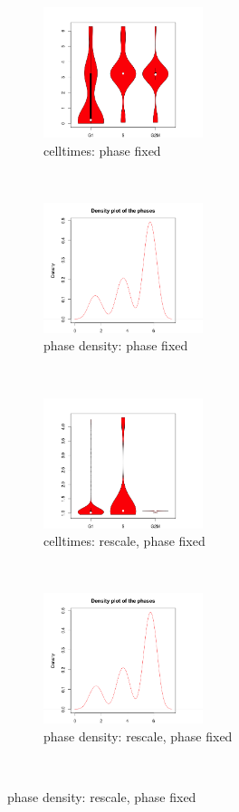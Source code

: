 \documentclass[11pt]{article}
\begin{document}
\begin{figure}[ht]
       \begin{subfigure}[t]{0.5\textwidth}
        \centering
        \includegraphics[height=1.5in]{../figures/cell_order_R_figs/marioni_phase_fixed_celltimes.png}
        \caption{celltimes: phase fixed}
    \end{subfigure}%
    ~
    \begin{subfigure}[t]{0.5\textwidth}
        \centering
        \includegraphics[height=1.5in]{../figures/cell_order_R_figs/marioni_phase_density_phase_in.png}
        \caption{phase density: phase fixed}
    \end{subfigure}\\
    
     \begin{subfigure}[t]{0.5\textwidth}
        \centering
        \includegraphics[height=1.5in]{../figures/cell_order_R_figs/marioni_phase_fixed_norm_celltimes.png}
        \caption{celltimes: rescale, phase fixed}
    \end{subfigure}%
    ~
       \begin{subfigure}[t]{0.5\textwidth}
        \centering
        \includegraphics[height=1.5in]{../figures/cell_order_R_figs/marioni_phase_density_phase_in_norm.png}
        \caption{phase density: rescale, phase fixed}
    \end{subfigure}\\


\end{figure}
\end{document}
